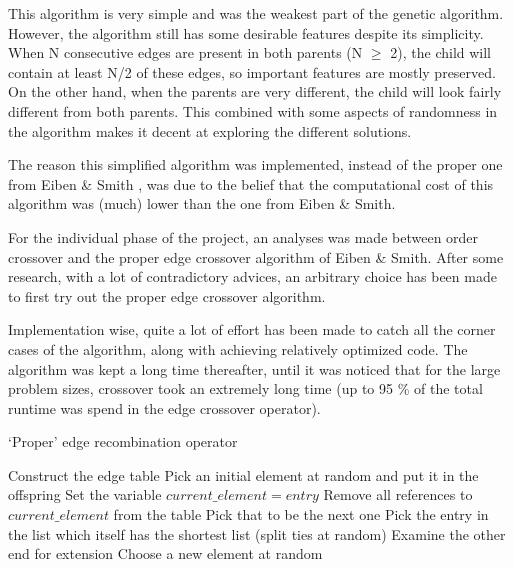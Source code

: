 \documentclass[a4paper,10pt]{article}
\begin{document}
This algorithm is very simple and was the weakest part of the genetic algorithm. However, the algorithm still has some desirable features despite its simplicity. When N consecutive edges are present in both parents (N $ \ge $ 2), the child will contain at least N/2 of these edges, so important features are mostly preserved. On the other hand,
when the parents are very different, the child will look fairly different from both parents. This combined with some aspects of randomness in the algorithm makes it decent at exploring the different solutions. 

The reason this simplified algorithm was implemented, instead of the proper one from Eiben \& Smith \cite{eiben_smith}, was due to the belief that the computational cost of this algorithm was (much) lower than the one from Eiben \& Smith. 

For the individual phase of the project, an analyses was made between order crossover and the proper edge crossover algorithm of Eiben \& Smith. After some research, with a lot of contradictory advices, an arbitrary choice has been made to first try out the proper edge crossover algorithm.

Implementation wise, quite a lot of effort has been made to catch all the corner cases of the algorithm, along with achieving relatively optimized code. The algorithm was kept a long time thereafter, until it was noticed that for the large problem sizes, crossover took an extremely long time (up to 95 \% of the total runtime was spend in the edge crossover operator).

\begin{algorithm}
\caption{`Proper' edge recombination operator \cite{eiben_smith}}\label{proper_edge_crossover}
\begin{algorithmic}
\State Construct the edge table
\State Pick an initial element at random and put it in the offspring
\State Set the variable $current\_element = entry$
\State Remove all references to $current\_element$ from the table
\State Pick that to be the next one
\Else
\State Pick the entry in the list which itself has the shortest list (split ties at random)
\EndIf
{}
\State Examine the other end for extension
\Else
\State Choose a new element at random
\EndIf
\EndIf
\EndWhile
\end{algorithmic}
\end{algorithm}
\end{document}
